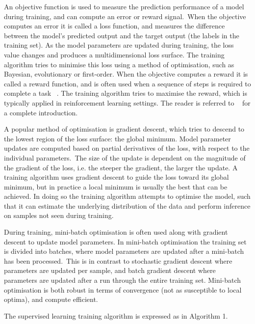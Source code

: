 \noindent An objective function is used to measure the prediction performance of a model during training, and can compute an error or reward signal.\ When the objective computes an error it is called a loss function, and measures the difference between the model's predicted output and the target output (the labels in the training set). As the model parameters are updated during training, the loss value changes and produces a multidimensional loss surface. The training algorithm tries to minimise this loss using a method of optimisation, such as Bayesian, evolutionary or first-order. When the objective computes a reward it is called a reward function, and is often used when a sequence of steps is required to complete a task \unskip ~\citep{murphy2012machine}. The training algorithm tries to maximise the reward, which is typically applied in reinforcement learning settings. The reader is referred to \unskip~\citep {sutton2018reinforcement} for a complete introduction. \par

\noindent A popular method of optimisation is gradient descent, which tries to descend to the lowest region of the loss surface: the global minimum. Model parameter updates are computed based on partial derivatives of the loss, with respect to the individual parameters.\ The size of the update is dependent on the magnitude of the gradient of the loss, i.e. the steeper the gradient, the larger the update. A training algorithm uses gradient descent to guide the loss toward its global minimum, but in practice a local minimum is usually the best that can be achieved. In doing so the training algorithm attempts to optimise the model, such that it can estimate the underlying distribution of the data and perform inference on samples not seen during training. \par

\noindent During training, mini-batch optimisation is often used along with gradient descent to update model parameters. In mini-batch optimisation the training set is divided into batches, where model parameters are updated after a mini-batch has been processed.\ This is in contrast to stochastic gradient descent where parameters are updated per sample, and batch gradient descent where parameters are updated after a run through the entire training set. Mini-batch optimisation is both robust in terms of convergence (not as susceptible to local optima), and compute efficient. \par

\noindent The supervised learning training algorithm is expressed as in Algorithm 1. \par 

